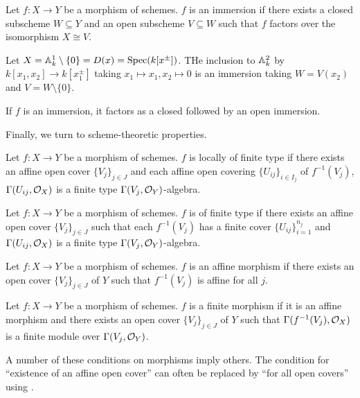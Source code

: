\begin{definition}[Immersion]\label{def: immersion}
    Let $f:X\to Y$ be a morphism of schemes. $f$ is an immersion if there exists a closed subscheme $W\subseteq Y$ and an open subscheme $V\subseteq W$ such that $f$ factors over the isomorphism $X\cong V$. 
\end{definition}
\begin{example}
    Let $X=\mathbb{A}^{1}_{k}\setminus\{0\}=D(x)=\operatorname{Spec}(k[x^{\pm}])$. THe inclusion to $\mathbb{A}^{2}_{k}$ by $k[x_{1},x_{2}]\to k[x_{1}^{\pm}]$ taking $x_{1}\mapsto x_{1},x_{2}\mapsto0$ is an immersion taking $W=V(x_{2})$ and $V=W\setminus\{0\}$. 
\end{example}
\begin{remark}
    If $f$ is an immersion, it factors as a closed followed by an open immersion. 
\end{remark}
Finally, we turn to scheme-theoretic properties. 
\begin{definition}\label{def: locally finite type}
    Let $f:X\to Y$ be a morphism of schemes. $f$ is locally of finite type if there exists an affine open cover $\{V_{j}\}_{j\in J}$ and each affine open covering $\{U_{ij}\}_{i\in I_{j}}$ of $f^{-1}(V_{j})$, $\Gamma(U_{ij},\mathcal{O}_{X})$ is a finite type $\Gamma(V_{j},\mathcal{O}_{Y})$-algebra. 
\end{definition}
\begin{definition}\label{def: finite type}
    Let $f:X\to Y$ be a morphism of schemes. $f$ is of finite type if there exists an affine open cover $\{V_{j}\}_{j\in J}$ such that each $f^{-1}(V_{j})$ has a finite cover $\{U_{ij}\}_{i=1}^{n_{j}}$ and $\Gamma(U_{ij},\mathcal{O}_{X})$ is a finite type $\Gamma(V_{j},\mathcal{O}_{Y})$-algebra.
\end{definition}
\begin{definition}\label{def: affine morphism}
    Let $f:X\to Y$ be a morphism of schemes. $f$ is an affine morphism if there exists an open cover $\{V_{j}\}_{j\in J}$ of $Y$ such that $f^{-1}(V_{j})$ is affine for all $j$. 
\end{definition}
\begin{definition}\label{def: finite morphism}
    Let $f:X\to Y$ be a morphism of schemes. $f$ is a finite morphism if it is an affine morphism and there exists an open cover $\{V_{j}\}_{j\in J}$ of $Y$ such that $\Gamma(f^{-1}(V_{j}),\mathcal{O}_{X})$ is a finite module over $\Gamma(V_{j},\mathcal{O}_{Y})$. 
\end{definition}
\begin{remark}
    A number of these conditions on morphisms imply others. The condition for ``existence of an affine open cover'' can often be replaced by ``for all open covers'' using .
\end{remark}